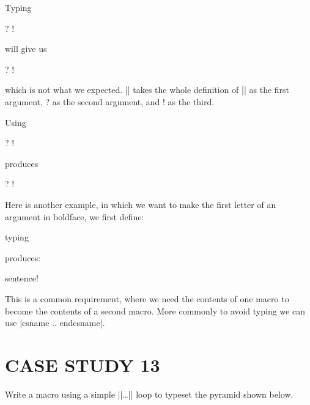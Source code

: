 \begin{teX}
\begin{teX}
\begin{teX}
\begin{teX}
\begin{teX}
\begin{teX}
Typing 

\begin{teX}
\lookatletters{} ? !
\end{teX}

will give us 

 \lookatletters{} ? !

 which is not what we expected. |\lookatletters| takes the whole definition of ||
as the first argument, ? as the second argument, and ! as
the third. 

Using 

\begin{teX}
\expandafter\lookatletters{}  ? !
\end{teX}

produces

\expandafter\lookatletters{}  ? !

\def\test{\expandafter\lookatletters\letters  ? !}
\bigskip

Here is another example, in which we want to make the first letter of an argument in boldface, we first define:
\begin{teX}
\def\nextbf#1{{\bf #1}}
\def\meintext{Example sentence!}
\end{teX}
typing
\begin{teX}
\expandafter\nextbf\meintext
\end{teX}

\def\nextbf#1{{\bf #1}}
\def\meintext{Example sentence!}

\noindent produces:

\smallskip
\expandafter\nextbf\meintext
\bigskip



This is a common requirement, where we need the contents of one macro to become the contents of
a second macro. More commonly to avoid typing we can use |csname .. endcsname|.




\chapter{CASE STUDY 13}
Write a macro using a simple |\loop|\ldots|\repeat| loop to typeset the pyramid shown below.

\topline
\def\triangle#1{{\def\bull{}%
\count1=0
\loop
   \edef\bull{$\bullet$\bull}
   \ifnum\count1<#1
      \advance\count1 by 1
      \centerline{\bull}
      \vskip-7.7pt
      \repeat
      \vskip 7.7pt\relax}}


\end{teX}
\end{teX}
\end{teX}
\end{teX}
\end{teX}
\end{teX}
